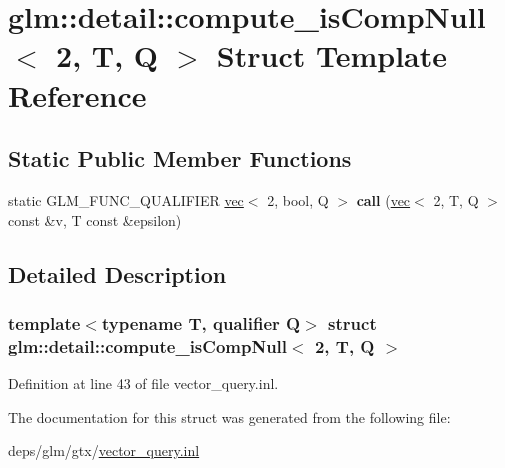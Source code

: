 \hypertarget{structglm_1_1detail_1_1compute__isCompNull_3_012_00_01T_00_01Q_01_4}{}\section{glm\+:\+:detail\+:\+:compute\+\_\+is\+Comp\+Null$<$ 2, T, Q $>$ Struct Template Reference}
\label{structglm_1_1detail_1_1compute__isCompNull_3_012_00_01T_00_01Q_01_4}
\subsection*{Static Public Member Functions}
\begin{DoxyCompactItemize}
\item 
\mbox{\label{structglm_1_1detail_1_1compute__isCompNull_3_012_00_01T_00_01Q_01_4_acec5e6ad7a0200dcbc038f9efcd97a36}} 
static G\+L\+M\+\_\+\+F\+U\+N\+C\+\_\+\+Q\+U\+A\+L\+I\+F\+I\+ER \hyperlink{structglm_1_1vec}{vec}$<$ 2, bool, Q $>$ {\bfseries call} (\hyperlink{structglm_1_1vec}{vec}$<$ 2, T, Q $>$ const \&v, T const \&epsilon)
\end{DoxyCompactItemize}


\subsection{Detailed Description}
\subsubsection*{template$<$typename T, qualifier Q$>$\newline
struct glm\+::detail\+::compute\+\_\+is\+Comp\+Null$<$ 2, T, Q $>$}



Definition at line 43 of file vector\+\_\+query.\+inl.



The documentation for this struct was generated from the following file\+:\begin{DoxyCompactItemize}
\item 
deps/glm/gtx/\hyperlink{vector__query_8inl}{vector\+\_\+query.\+inl}\end{DoxyCompactItemize}
